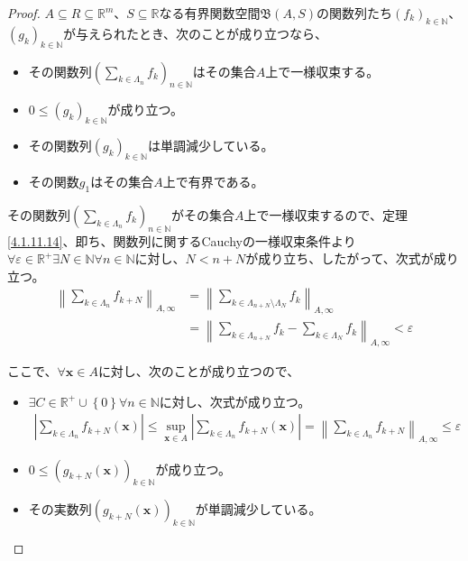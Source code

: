 \documentclass[dvipdfmx]{jsarticle}
\begin{document}
\begin{proof}
$A \subseteq R \subseteq \mathbb{R}^{m}$、$S \subseteq \mathbb{R}$なる有界関数空間$\mathfrak{B}(A,S)$の関数列たち$\left( f_{k} \right)_{k \in \mathbb{N}}$、$\left( g_{k} \right)_{k \in \mathbb{N}}$が与えられたとき、次のことが成り立つなら、
\begin{itemize}
\item
  その関数列$\left( \sum_{k \in \varLambda_{n}} f_{k} \right)_{n \in \mathbb{N}}$はその集合$A$上で一様収束する。
\item
  $0 \leq \left( g_{k} \right)_{k \in \mathbb{N}}$が成り立つ。
\item
  その関数列$\left( g_{k} \right)_{k \in \mathbb{N}}$は単調減少している。
\item
  その関数$g_{1}$はその集合$A$上で有界である。
\end{itemize}
その関数列$\left( \sum_{k \in \varLambda_{n}} f_{k} \right)_{n \in \mathbb{N}}$がその集合$A$上で一様収束するので、定理\ref{4.1.11.14}、即ち、関数列に関するCauchyの一様収束条件より$\forall\varepsilon \in \mathbb{R}^{+}\exists N \in \mathbb{N}\forall n \in \mathbb{N}$に対し、$N < n + N$が成り立ち、したがって、次式が成り立つ。
\begin{align*}
\left\| \sum_{k \in \varLambda_{n}} f_{k + N} \right\|_{A,\infty} &= \left\| \sum_{k \in \varLambda_{n + N} \setminus \varLambda_{N}} f_{k} \right\|_{A,\infty}\\
&= \left\| \sum_{k \in \varLambda_{n + N}} f_{k} - \sum_{k \in \varLambda_{N}} f_{k} \right\|_{A,\infty} < \varepsilon
\end{align*}\par
ここで、$\forall\mathbf{x} \in A$に対し、次のことが成り立つので、
\begin{itemize}
\item
  $\exists C \in \mathbb{R}^{+} \cup \left\{ 0 \right\}\forall n \in \mathbb{N}$に対し、次式が成り立つ。
\begin{align*}
\left| \sum_{k \in \varLambda_{n}} {f_{k + N}\left( \mathbf{x} \right)} \right| \leq \sup_{\mathbf{x} \in A}\left| \sum_{k \in \varLambda_{n}} {f_{k + N}\left( \mathbf{x} \right)} \right| = \left\| \sum_{k \in \varLambda_{n}} f_{k + N} \right\|_{A,\infty} \leq \varepsilon
\end{align*}
\item
  $0 \leq \left( g_{k + N}\left( \mathbf{x} \right) \right)_{k \in \mathbb{N}}$が成り立つ。
\item
  その実数列$\left( g_{k + N}\left( \mathbf{x} \right) \right)_{k \in \mathbb{N}}$が単調減少している。

\end{itemize}
\end{proof}
\end{document}
